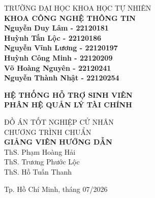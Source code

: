\begin{titlepage}
\begin{singlespace}
\begin{center}

TRƯỜNG ĐẠI HỌC KHOA HỌC TỰ NHIÊN\\
\textbf{KHOA CÔNG NGHỆ THÔNG TIN}\\[1.5cm]


{\large \bfseries Nguyễn Duy Lâm - 22120181\\} 
{\large \bfseries Huỳnh Tấn Lộc - 22120186\\}
{\large \bfseries Nguyễn Vĩnh Lương - 22120197\\}
{\large \bfseries Huỳnh Công Minh - 22120209\\}
{\large \bfseries Võ Hoàng Nguyên - 22120241\\}
{\large \bfseries Nguyễn Thành Nhật - 22120254\\[1.2cm]}


{ \Large \bfseries HỆ THỐNG HỖ TRỢ SINH VIÊN\\ PHÂN HỆ QUẢN LÝ TÀI CHÍNH\\[1.5cm] } 


\large ĐỒ ÁN TỐT NGHIỆP CỬ NHÂN\\
\large CHƯƠNG TRÌNH CHUẨN\\[1.2cm]

\ifShowGVHD
\vspace{0.8cm}
\textbf{GIẢNG VIÊN HƯỚNG DẪN}\\
ThS. Phạm Hoàng Hải\\
ThS. Trương Phước Lộc\\
ThS. Hồ Tuấn Thanh
\fi


\vfill
Tp. Hồ Chí Minh, tháng 07/2026

\end{center}
\end{singlespace}
\end{titlepage}

